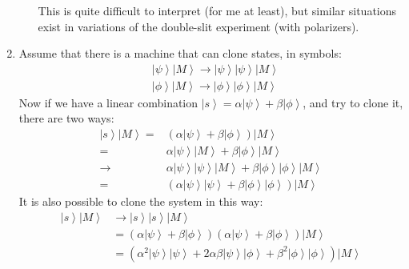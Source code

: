 \documentclass[12pt,a4]{article}
\begin{document}
\begin{enumerate}
\begin{enumerate}
        This is quite difficult to interpret (for me at least), but similar situations exist in variations of the double-slit experiment (with polarizers).
    \end{enumerate}
  \item
    Assume that there is a machine that can clone states, in symbols:
    \begin{align*}
      & \left|\psi\right\rangle \left|M\right\rangle \to \left|\psi\right\rangle \left|\psi\right\rangle \left|M\right\rangle\\
      & \left|\phi\right\rangle \left|M\right\rangle \to \left|\phi\right\rangle \left|\phi\right\rangle \left|M\right\rangle
    \end{align*}
    Now if we have a linear combination $\left|s\right\rangle = \alpha\left|\psi\right\rangle + \beta \left|\phi\right\rangle$, and try to clone it, there are two ways:
    \begin{align*}
      \left|s\right\rangle\left|M\right\rangle =& \left(\alpha\left|\psi\right\rangle + \beta \left|\phi\right\rangle\right) \left|M\right\rangle\\
                                               =& \alpha\left|\psi\right\rangle \left|M\right\rangle + \beta \left|\phi\right\rangle \left|M\right\rangle\\
                                            \to & \alpha\left|\psi\right\rangle \left|\psi\right\rangle \left|M\right\rangle + \beta \left|\phi\right\rangle\left|\phi\right\rangle \left|M\right\rangle\\
                                               =& (\alpha\left|\psi\right\rangle \left|\psi\right\rangle  + \beta \left|\phi\right\rangle\left|\phi\right\rangle) \left|M\right\rangle
    \end{align*}
    It is also possible to clone the system in this way:
    \begin{align*}
      \left|s\right\rangle\left|M\right\rangle &\to \left|s\right\rangle\left|s\right\rangle\left|M\right\rangle \\
                                               &= \left(\alpha\left|\psi\right\rangle + \beta \left|\phi\right\rangle\right) \left(\alpha\left|\psi\right\rangle + \beta \left|\phi\right\rangle\right)\left|M\right\rangle \\
                                               &= \left(\alpha^2\left|\psi\right\rangle \left|\psi\right\rangle  + 2 \alpha \beta \left|\psi\right\rangle \left|\phi\right\rangle + \beta^2 \left|\phi\right\rangle \left|\phi\right\rangle\right)\left|M\right\rangle

\end{align*}
\end{enumerate}
\end{document}
